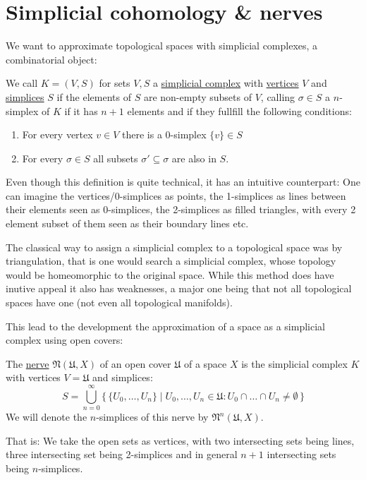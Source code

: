 \section{Simplicial cohomology \& nerves}
We want to approximate topological spaces with simplicial complexes, a combinatorial
object:
\begin{definition}
We call $K = (V, S)$ for sets $V,S$ a \underline{simplicial complex} with
\underline{vertices} $V$ and \underline{simplices} $S$ if the elements of $S$
are non-empty subsets of $V$, calling $\sigma \in S$ a $n$-simplex of $K$ if
it has $n + 1$ elements and if they fullfill the following conditions:
\begin{enumerate}
	\item For every vertex $v \in V$ there is a 0-simplex $\{v\} \in S$
	\item For every $\sigma \in S$ all subsets $\sigma' \subseteq \sigma$
		are also in $S$.
\end{enumerate}
\end{definition}
Even though this definition is quite technical, it has an intuitive counterpart:
One can imagine the vertices/0-simplices as points, the 1-simplices as lines between
their elements seen as 0-simplices, the 2-simplices as filled triangles, with
every 2 element subset of them seen as their boundary lines etc.


The classical way to assign a simplicial complex to a topological space was by triangulation,
that is one would search a simplicial complex, whose topology would be homeomorphic to
the original space. While this method does have inutive appeal it also has weaknesses,
a major one being that not all topological spaces have one (not even all topological
manifolds).

This lead to the development the approximation of a space as a simplicial complex using
open covers:
\begin{definition}
	The \underline{nerve} $\mathfrak{N}(\mathfrak{U}, X)$ of an open cover
	$\mathfrak{U}$ of a space $X$ is the simplicial complex $K$ with
	vertices $V = \mathfrak{U}$ and simplices:
	\[
		S = \bigcup_{n = 0}^\infty
			\{\,
				\{ U_0, \dots, U_n \}
				\mid
				U_0, \dots, U_n \in \mathfrak{U}:
				U_0 \cap \dots \cap U_n \neq \emptyset
			\,\}
	\]
	We will denote the $n$-simplices of this nerve by $\mathfrak{N}^n(\mathfrak{U}, X)$.
\end{definition}
That is: We take the open sets as vertices, with two intersecting sets being lines, three intersecting
set being 2-simplices and in general $n + 1$ intersecting sets being $n$-simplices.

